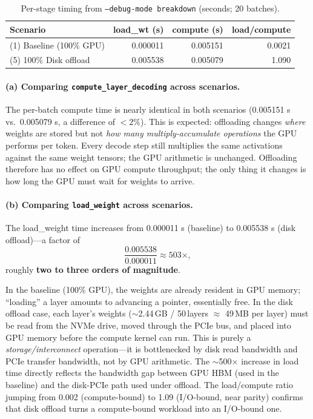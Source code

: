\documentclass[12pt,a4paper]{article}
\begin{document}
\begin{table}[H]
\centering
\caption{Per-stage timing from \texttt{--debug-mode breakdown} (seconds; 20 batches).}
\begin{tabular}{lrrr}
\toprule
\textbf{Scenario} & \textbf{load\_wt (s)} & \textbf{compute (s)} & \textbf{load/compute} \\
\midrule
(1) Baseline (100\% GPU)  & 0.000011 & 0.005151 & 0.0021 \\
(5) 100\% Disk offload    & 0.005538 & 0.005079 & 1.090  \\
\bottomrule
\end{tabular}
\end{table}

\paragraph{(a) Comparing \texttt{compute\_layer\_decoding} across scenarios.}

The per-batch compute time is nearly identical in both scenarios (0.005151 s vs.\ 0.005079 s, a difference of $<2\%$).
This is expected: offloading changes \emph{where} weights are stored but not \emph{how many multiply-accumulate operations} the GPU performs per token.
Every decode step still multiplies the same activations against the same weight tensors; the GPU arithmetic is unchanged.
Offloading therefore has no effect on GPU compute throughput; the only thing it changes is how long the GPU must wait for weights to arrive.

\paragraph{(b) Comparing \texttt{load\_weight} across scenarios.}

The load\_weight time increases from 0.000011 s (baseline) to 0.005538 s (disk offload)---a factor of
\[
  \frac{0.005538}{0.000011} \approx 503\times,
\]
roughly \textbf{two to three orders of magnitude}.

In the baseline (100\% GPU), the weights are already resident in GPU memory; ``loading'' a layer amounts to advancing a pointer, essentially free.
In the disk offload case, each layer's weights ($\sim$2.44\,GB / 50\,layers $\approx$ 49\,MB per layer) must be read from the NVMe drive, moved through the PCIe bus, and placed into GPU memory before the compute kernel can run.
This is purely a \emph{storage/interconnect} operation---it is bottlenecked by disk read bandwidth and PCIe transfer bandwidth, not by GPU arithmetic.
The $\sim$500$\times$ increase in load time directly reflects the bandwidth gap between GPU HBM (used in the baseline) and the disk-PCIe path used under offload.
The load/compute ratio jumping from 0.002 (compute-bound) to 1.09 (I/O-bound, near parity) confirms that disk offload turns a compute-bound workload into an I/O-bound one.
\end{document}
